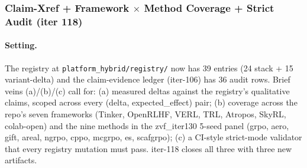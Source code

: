 
\subsubsection{Claim-Xref + Framework \texorpdfstring{$\times$}{x} Method Coverage + Strict Audit (iter 118)}
\label{sec:p6-iter118-claim-xref}

\paragraph{Setting.}
The registry at \texttt{platform_hybrid/registry/} now has 39 entries (24 stack + 15
variant-delta) and the claim-evidence ledger (iter-106) has 36 audit rows.
Brief veins (a)/(b)/(c) call for: (a) measured deltas against the registry's
qualitative claims, scoped across every (delta, expected\_effect) pair;
(b) coverage across the repo's seven frameworks
(Tinker, OpenRLHF, VERL, TRL, Atropos, SkyRL, colab-open) and the nine
methods in the zvf\_iter130 5-seed panel (grpo, aero, gift, areal, ngrpo,
cppo, mcgrpo, es, scafgrpo); (c) a CI-style strict-mode validator that
every registry mutation must pass. iter-118 closes all three with three
new artifacts.

